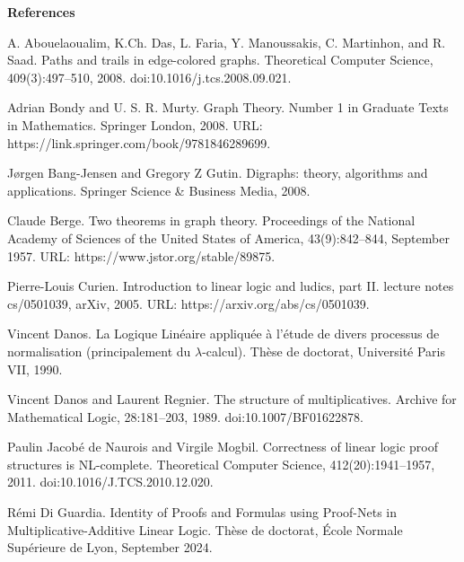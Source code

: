 
 
\par\medskip\noindent\textbf{References}\par
  
\par\noindent  [1]  A. Abouelaoualim, K.Ch. Das, L. Faria, Y. Manoussakis, C. Martinhon, and R. Saad.  Paths and trails in edge-colored graphs.  Theoretical Computer Science, 409(3):497–510, 2008.  doi:10.1016/j.tcs.2008.09.021.  
 
\par\noindent  [2]  Adrian Bondy and U. S. R. Murty.  Graph Theory.  Number 1 in Graduate Texts in Mathematics. Springer London, 2008.  URL: https://link.springer.com/book/9781846289699.  
 
\par\noindent  [3]  Jørgen Bang-Jensen and Gregory Z Gutin.  Digraphs: theory, algorithms and applications.  Springer Science \& Business Media, 2008.  
 
\par\noindent  [4]  Claude Berge.  Two theorems in graph theory.  Proceedings of the National Academy of Sciences of the United States of America, 43(9):842–844, September 1957.  URL: https://www.jstor.org/stable/89875.  
 
\par\noindent  [5]  Pierre-Louis Curien.  Introduction to linear logic and ludics, part II.  lecture notes cs/0501039, arXiv, 2005.  URL: https://arxiv.org/abs/cs/0501039.  
 
\par\noindent  [6]  Vincent Danos.  La Logique Linéaire appliquée à l’étude de divers processus de normalisation (principalement du $\lambda$-calcul).  Thèse de doctorat, Université Paris VII, 1990.  
 
\par\noindent  [7]  Vincent Danos and Laurent Regnier.  The structure of multiplicatives.  Archive for Mathematical Logic, 28:181–203, 1989.  doi:10.1007/BF01622878.  
 
\par\noindent  [8]  Paulin Jacobé de Naurois and Virgile Mogbil.  Correctness of linear logic proof structures is NL-complete.  Theoretical Computer Science, 412(20):1941–1957, 2011.  doi:10.1016/J.TCS.2010.12.020.  
 
\par\noindent  [9]  Rémi Di Guardia.  Identity of Proofs and Formulas using Proof-Nets in Multiplicative-Additive Linear Logic.  Thèse de doctorat, École Normale Supérieure de Lyon, September 2024.  
 
